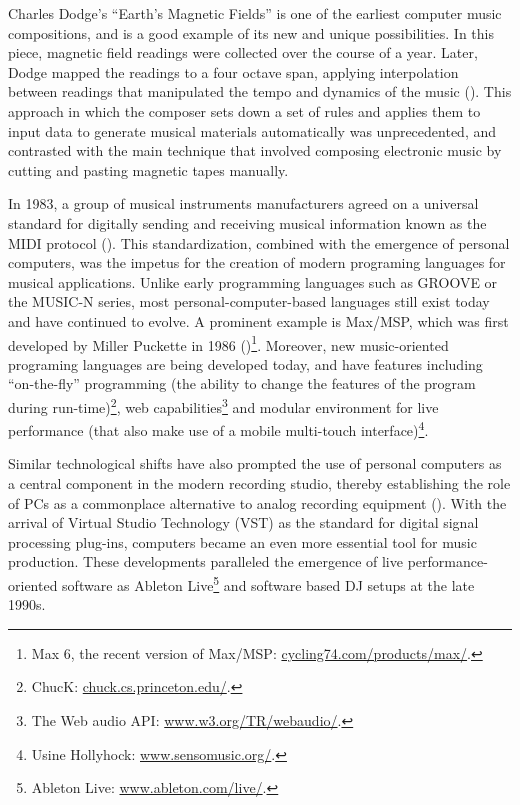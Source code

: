\documentclass[a4paper,11pt]{article}
\begin{document}
Charles Dodge's ``Earth's Magnetic Fields'' is one of the earliest computer music compositions, and is a good example of its new and unique possibilities.
In this piece, magnetic field readings were collected over the course of a year.
Later, Dodge mapped the readings to a four octave span, applying interpolation between readings that manipulated the tempo and dynamics of the music (\cite{scriptsgrooves14}).
This approach in which the composer sets down a set of rules and applies them to input data to generate musical materials automatically was unprecedented, and contrasted with the main technique that involved composing electronic music by cutting and pasting magnetic tapes manually.

In 1983, a group of musical instruments manufacturers agreed on a universal standard for digitally sending and receiving musical information known as the MIDI protocol (\cite{web:quinn}).
This standardization, combined with the emergence of personal computers, was the impetus for the creation of modern programing languages for musical applications.
Unlike early programming languages such as GROOVE or the MUSIC-N series, most personal-computer-based languages still exist today and have continued to evolve.
A prominent example is Max/MSP, which was first developed by Miller Puckette in 1986 (\cite[p. 16]{winkler01})\footnote{Max 6, the recent version of Max/MSP: \href{http://cycling74.com/products/max/}{cycling74.com/products/max/}.}.
Moreover, new music-oriented programing languages are being developed today, and have features including ``on-the-fly'' programming (the ability to change the features of the program during run-time)\footnote{ChucK: \href{http://chuck.cs.princeton.edu/}{chuck.cs.princeton.edu/}.}, web capabilities\footnote{The Web audio API: \href{http://www.w3.org/TR/webaudio/}{www.w3.org/TR/webaudio/}.} and modular environment for live performance (that also make use of a mobile multi-touch interface)\footnote{Usine Hollyhock: \href{http://www.sensomusic.org/}{www.sensomusic.org/}.}.

Similar technological shifts have also prompted the use of personal computers as a central component in the modern recording studio, thereby establishing the role of PCs as a commonplace alternative to analog recording equipment (\cite{leider:04}).
With the arrival of Virtual Studio Technology (VST) as the standard for digital signal processing plug-ins, computers became an even more essential tool for music production.
These developments paralleled the emergence of live performance-oriented software as Ableton Live\footnote{Ableton Live: \href{http://www.ableton.com/en/live/}{www.ableton.com/live/}.} and software based DJ setups at the late 1990s.
\end{document}
